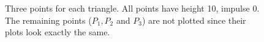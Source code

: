 \begin{figure}[ht]

  \caption{Three points for each triangle. All points have height 10, impulse 0. The remaining points ($P_1, P_2$ and $P_3$) are not plotted since their plots look exactly the same.}
  \label{fig:three-points-equal}
\end{figure}


